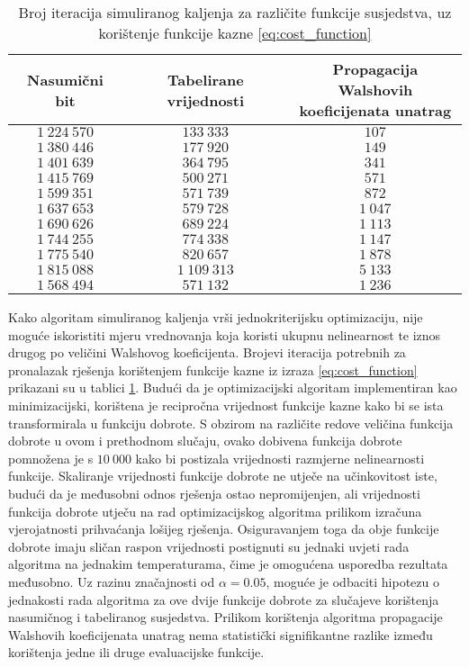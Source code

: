 \begin{table}[]
    \centering
    \captionsetup{justification=centering}
    \caption{Broj iteracija simuliranog kaljenja za različite funkcije susjedstva, uz korištenje funkcije kazne \eqref{eq:cost_function}}
    \begin{tabular}{ccc} \hline
        Nasumični bit & Tabelirane vrijednosti & \makecell{Propagacija Walshovih \\ koeficijenata unatrag} \\ \hline
        $1\:224\:570$ &    $133\:333$ &    $107$ \\
        $1\:380\:446$ &    $177\:920$ &    $149$ \\
        $1\:401\:639$ &    $364\:795$ &    $341$ \\
        $1\:415\:769$ &    $500\:271$ &    $571$ \\
        $1\:599\:351$ &    $571\:739$ &    $872$ \\
        $1\:637\:653$ &    $579\:728$ & $1\:047$ \\
        $1\:690\:626$ &    $689\:224$ & $1\:113$ \\
        $1\:744\:255$ &    $774\:338$ & $1\:147$ \\
        $1\:775\:540$ &    $820\:657$ & $1\:878$ \\
        $1\:815\:088$ & $1\:109\:313$ & $5\:133$ \\ \hline
        $1\:568\:494$ &    $571\:132$ & $1\:236$
    \end{tabular}
    \label{tbl:simaneal_6_walshe}
\end{table}
Kako algoritam simuliranog kaljenja vrši jednokriterijsku optimizaciju, nije moguće iskoristiti mjeru vrednovanja koja koristi ukupnu nelinearnost te iznos drugog po veličini Walshovog koeficijenta.
Brojevi iteracija potrebnih za pronalazak rješenja korištenjem funkcije kazne iz izraza \eqref{eq:cost_function} prikazani su u tablici \ref{tbl:simaneal_6_walshe}.
Budući da je optimizacijski algoritam implementiran kao minimizacijski, korištena je recipročna vrijednost funkcije kazne kako bi se ista transformirala u funkciju dobrote.
S obzirom na različite redove veličina funkcija dobrote u ovom i prethodnom slučaju, ovako dobivena funkcija dobrote pomnožena je s $10\:000$ kako bi postizala vrijednosti razmjerne nelinearnosti funkcije.
Skaliranje vrijednosti funkcije dobrote ne utječe na učinkovitost iste, budući da je međusobni odnos rješenja ostao nepromijenjen, ali vrijednosti funkcija dobrote utječu na rad optimizacijskog algoritma prilikom izračuna vjerojatnosti prihvaćanja lošijeg rješenja.
Osiguravanjem toga da obje funkcije dobrote imaju sličan raspon vrijednosti postignuti su jednaki uvjeti rada algoritma na jednakim temperaturama, čime je omogućena usporedba rezultata međusobno.
Uz razinu značajnosti od $\alpha = 0.05$, moguće je odbaciti hipotezu o jednakosti rada algoritma za ove dvije funkcije dobrote za slučajeve korištenja nasumičnog i tabeliranog susjedstva.
Prilikom korištenja algoritma propagacije Walshovih koeficijenata unatrag nema statistički signifikantne razlike između korištenja jedne ili druge evaluacijske funkcije.

